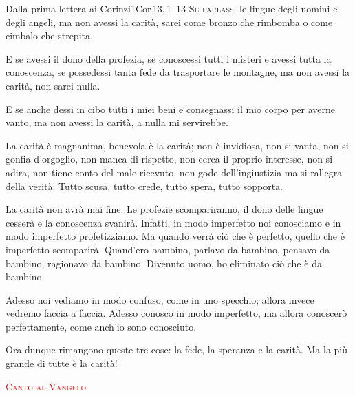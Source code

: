 \documentclass[11pt]{book}
\renewcommand{\intestfont}[1]{{\Large\scshape\textcolor{red}{#1}}}
\newcommand{\sottomomento}[1]{{\intestfont{#1}}\par\medskip}
\begin{document}
\begin{lettura}[Seconda]{Dalla prima lettera ai Corinzi}{1Cor\,13,\,1--13}
\lettrine[lines=3]{S}{e parlassi} le lingue degli uomini e degli angeli, ma non avessi la carità, sarei come bronzo che rimbomba o come cimbalo che strepita.

E se avessi il dono della profezia, se conoscessi tutti i misteri e avessi tutta la conoscenza, se possedessi tanta fede da trasportare le montagne, ma non avessi la carità, non sarei nulla.

E se anche dessi in cibo tutti i miei beni e consegnassi il mio corpo per averne vanto, ma non avessi la carità, a nulla mi servirebbe.

La carità è magnanima, benevola è la carità; non è invidiosa, non si vanta, non si gonfia d'orgoglio, non manca di rispetto, non cerca il proprio interesse, non si adira, non tiene conto del male ricevuto, non gode dell'ingiustizia ma si rallegra della verità. Tutto scusa, tutto crede, tutto spera, tutto sopporta.

La carità non avrà mai fine. Le profezie scompariranno, il dono delle lingue cesserà e la conoscenza svanirà. Infatti, in modo imperfetto noi conosciamo e in modo imperfetto profetizziamo. Ma quando verrà ciò che è perfetto, quello che è imperfetto scomparirà. Quand'ero bambino, parlavo da bambino, pensavo da bambino, ragionavo da bambino. Divenuto uomo, ho eliminato ciò che è da bambino.

Adesso noi vediamo in modo confuso, come in uno specchio; allora invece vedremo faccia a faccia. Adesso conosco in modo imperfetto, ma allora conoscerò perfettamente, come anch'io sono conosciuto. 

Ora dunque rimangono queste tre cose: la fede, la speranza e la carità. Ma la più grande di tutte è la carità!
\end{lettura}

\newpage%
\sottomomento{Canto al Vangelo}
\end{document}
